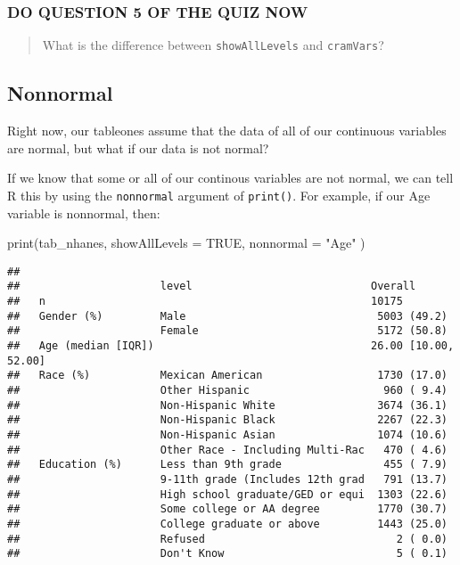\documentclass[
]{book}
\newenvironment{Shaded}{\begin{snugshade}}{\end{snugshade}}
\newcommand{\AttributeTok}[1]{\textcolor[rgb]{0.77,0.63,0.00}{#1}}
\newcommand{\ConstantTok}[1]{\textcolor[rgb]{0.00,0.00,0.00}{#1}}
\newcommand{\FunctionTok}[1]{\textcolor[rgb]{0.00,0.00,0.00}{#1}}
\newcommand{\NormalTok}[1]{#1}
\newcommand{\StringTok}[1]{\textcolor[rgb]{0.31,0.60,0.02}{#1}}
\begin{document}
\hypertarget{do-question-5-of-the-quiz-now-4}{%
\subsubsection{DO QUESTION 5 OF THE QUIZ NOW}\label{do-question-5-of-the-quiz-now-4}}

\begin{quote}
What is the difference between \texttt{showAllLevels} and \texttt{cramVars}?
\end{quote}

\hypertarget{nonnormal}{%
\subsection{Nonnormal}\label{nonnormal}}

Right now, our tableones assume that the data of all of our continuous variables are normal, but what if our data is not normal?

If we know that some or all of our continous variables are not normal, we can tell R this by using the \texttt{nonnormal} argument of \texttt{print()}. For example, if our Age variable is nonnormal, then:

\begin{Shaded}
\begin{Highlighting}[]
\FunctionTok{print}\NormalTok{(tab\_nhanes, }
      \AttributeTok{showAllLevels =} \ConstantTok{TRUE}\NormalTok{,}
      \AttributeTok{nonnormal =} \StringTok{"Age"}
\NormalTok{     )}
\end{Highlighting}
\end{Shaded}

\begin{verbatim}
##
##                      level                            Overall
##   n                                                   10175
##   Gender (%)         Male                              5003 (49.2)
##                      Female                            5172 (50.8)
##   Age (median [IQR])                                  26.00 [10.00, 52.00]
##   Race (%)           Mexican American                  1730 (17.0)
##                      Other Hispanic                     960 ( 9.4)
##                      Non-Hispanic White                3674 (36.1)
##                      Non-Hispanic Black                2267 (22.3)
##                      Non-Hispanic Asian                1074 (10.6)
##                      Other Race - Including Multi-Rac   470 ( 4.6)
##   Education (%)      Less than 9th grade                455 ( 7.9)
##                      9-11th grade (Includes 12th grad   791 (13.7)
##                      High school graduate/GED or equi  1303 (22.6)
##                      Some college or AA degree         1770 (30.7)
##                      College graduate or above         1443 (25.0)
##                      Refused                              2 ( 0.0)
##                      Don't Know                           5 ( 0.1)
\end{verbatim}
\end{document}
